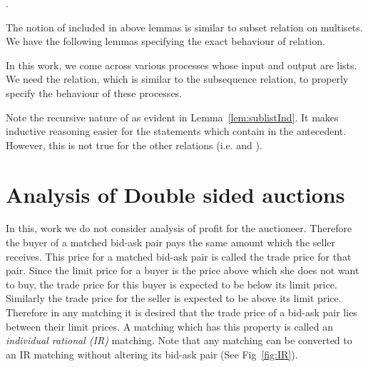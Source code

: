 \documentclass[a4paper,UKenglish,cleveref, autoref]{lipics-v2019}
\begin{document}
\begin{lemma}
.
\end{lemma}
\begin{lemma}
\end{lemma}

The notion of included in above lemmas is similar to subset relation on multisets. We have the following lemmas specifying the exact behaviour of  relation.
\begin{lemma}
\end{lemma}
\begin{lemma}
\end{lemma}

In this work, we come across various processes whose input and output are lists. We need the  relation, which is similar to the subsequence relation, to properly specify the behaviour of these processes.  

\begin{lemma} 
\end{lemma}
\begin{lemma}\label{lem:sublistInd} 
\end{lemma}

Note the recursive nature of  as evident in Lemma~\ref{lem:sublistInd}. It  makes inductive reasoning easier for the statements which contain  in the antecedent. However, this is  not true for the other relations (i.e.  and ).

\section{Analysis of Double sided auctions}\label{sec:analysis}
In this, work we do not consider analysis of profit for the auctioneer. Therefore the buyer of a matched bid-ask pair pays the same amount which the seller receives. This price for a matched  bid-ask pair is called the trade price for that pair. Since the limit price for a buyer is the price above which she does not want to buy, the trade price for this buyer is expected to be below its limit price. Similarly the trade price for the seller is expected to be above its limit price. Therefore in any matching it is desired that the trade price of a bid-ask pair lies between their limit prices. A matching which has this property is called an \emph{individual rational (IR)} matching. Note that any matching can be converted to an IR matching without altering its bid-ask pair (See Fig~\ref{fig:IR}).
\end{document}
